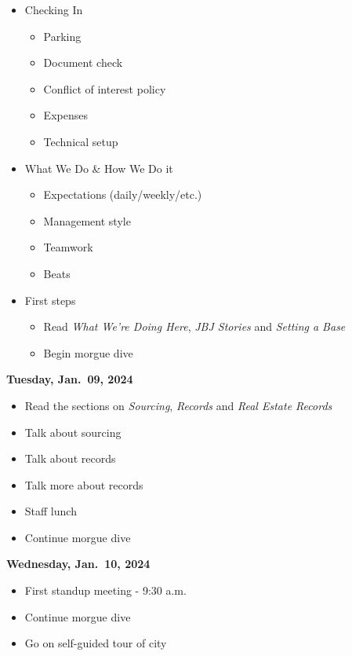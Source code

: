 \documentclass[
  11pt,
  american,
  letterpaperpaper,
  extrafontsizes,onecolumn,openright
  ]{memoir}
\providecommand{\tightlist}{%
  \setlength{\itemsep}{0pt}\setlength{\parskip}{0pt}}
\begin{document}
\begin{itemize}
\tightlist
\item
  Checking In

  \begin{itemize}
  \tightlist
  \item
    Parking
  \item
    Document check
  \item
    Conflict of interest policy
  \item
    Expenses
  \item
    Technical setup
  \end{itemize}
\item
  What We Do \& How We Do it

  \begin{itemize}
  \tightlist
  \item
    Expectations (daily/weekly/etc.)
  \item
    Management style
  \item
    Teamwork
  \item
    Beats
  \end{itemize}
\item
  First steps

  \begin{itemize}
  \tightlist
  \item
    Read \emph{What We're Doing Here}, \emph{JBJ Stories} and \emph{Setting a Base}
  \item
    Begin morgue dive
  \end{itemize}
\end{itemize}

\textbf{Tuesday, Jan.~09, 2024}

\begin{itemize}
\item
  Read the sections on \emph{Sourcing}, \emph{Records} and \emph{Real Estate Records}
\item
  Talk about sourcing
\item
  Talk about records
\item
  Talk more about records
\item
  Staff lunch
\item
  Continue morgue dive
\end{itemize}

\newpage

\textbf{Wednesday, Jan.~10, 2024}

\begin{itemize}
\tightlist
\item
  First standup meeting - 9:30 a.m.
\item
  Continue morgue dive
\item
  Go on self-guided tour of city
\end{itemize}
\end{document}
